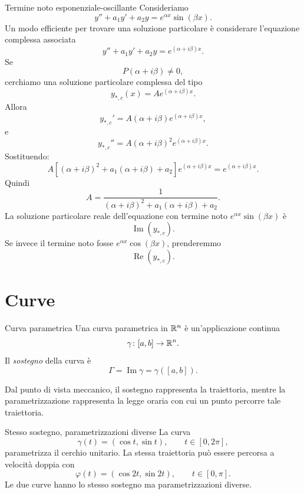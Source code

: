 \documentclass[a4paper]{article}
\begin{document}
\begin{radioactive}
\begin{snippetexample}{Termine noto esponenziale-oscillante}
    Consideriamo
    \[
        y''+a_1y'+a_2y=e^{\alpha x}\sin(\beta x).
    \]
    Un modo efficiente per trovare una soluzione particolare è considerare l'equazione complessa associata
    \[
        y''+a_1y'+a_2y=e^{(\alpha+i\beta)x}.
    \]
    Se
    \[
        P(\alpha+i\beta)\neq 0,
    \]
    cerchiamo una soluzione particolare complessa del tipo
    \[
        y_{\ast,c}(x)=Ae^{(\alpha+i\beta)x}.
    \]
    Allora
    \[
        y_{\ast,c}'=A(\alpha+i\beta)e^{(\alpha+i\beta)x},
    \]
    e
    \[
        y_{\ast,c}''=A(\alpha+i\beta)^2e^{(\alpha+i\beta)x}.
    \]
    Sostituendo:
    \[
        A\left[
            (\alpha+i\beta)^2+a_1(\alpha+i\beta)+a_2
        \right]e^{(\alpha+i\beta)x}
        =
        e^{(\alpha+i\beta)x}.
    \]
    Quindi
    \[
        A=
        \frac{1}{
            (\alpha+i\beta)^2+a_1(\alpha+i\beta)+a_2
        }.
    \]
    La soluzione particolare reale dell'equazione con termine noto \(e^{\alpha x}\sin(\beta x)\) è
    \[
        \operatorname{Im}\left(y_{\ast,c}\right).
    \]
    Se invece il termine noto fosse \(e^{\alpha x}\cos(\beta x)\), prenderemmo
    \[
        \operatorname{Re}\left(y_{\ast,c}\right).
    \]
\end{snippetexample}
\end{radioactive}

\pagebreak

\section{Curve}

\begin{snippetdefinition}{Curva parametrica}
    Una curva parametrica in \(\mathbb{R}^n\) è un'applicazione continua
    \[
        \gamma\colon[a,b]\to\mathbb{R}^n.
    \]
    Il \emph{sostegno} della curva è
    \[
        \Gamma=\operatorname{Im}\gamma=\gamma([a,b]).
    \]
\end{snippetdefinition}

Dal punto di vista meccanico, il sostegno rappresenta la traiettoria, mentre la parametrizzazione
rappresenta la legge oraria con cui un punto percorre tale traiettoria.

\begin{snippetexample}{Stesso sostegno, parametrizzazioni diverse}
    La curva
    \[
        \gamma(t)=(\cos t,\sin t),\qquad t\in[0,2\pi],
    \]
    parametrizza il cerchio unitario. La stessa traiettoria può essere percorsa a velocità doppia con
    \[
        \varphi(t)=(\cos 2t,\sin 2t),\qquad t\in[0,\pi].
    \]
    Le due curve hanno lo stesso sostegno ma parametrizzazioni diverse.
\end{snippetexample}
\end{document}
